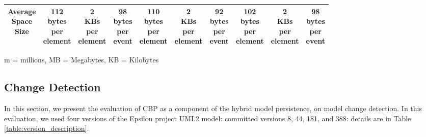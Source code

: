 \documentclass{llncs}
\begin{document}
\begin{table} [ht]
\begin{footnotesize}
\begin{tabular}{| c | c  c  c | c c c | c c c |}
\makecell{Average\\Space\\Size} & \makecell{112\\bytes\\per\\element} & \makecell{2\\KBs\\per\\element}  & \makecell{98 \\bytes\\per\\event} & \makecell{110\\bytes\\per\\element} & \makecell{2\\KBs\\per\\element} & \makecell{92\\bytes\\per\\event} & \makecell{102\\bytes\\per\\element} & \makecell{2\\KBs\\per\\element} & \makecell{98\\bytes\\per\\event} \\
\hline 
\end{tabular}
\justify
m = millions, MB = Megabytes, KB = Kilobytes
\end{footnotesize}
\end{table}

\subsection{Change Detection}
\label{sec:change_detection}
In this section, we present the evaluation of CBP as a component of the hybrid model persistence, on model change detection. In this evaluation, we used four versions of the Epsilon project UML2 model: committed versions 8, 44, 181, and 388: details are in Table \ref{table:version_description}.
\end{document}
